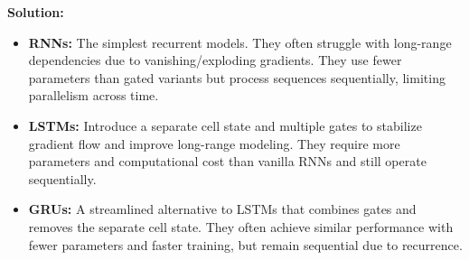 \documentclass{article}
\begin{document}
\begin{enumerate}
   \textbf{Solution:}
    \begin{itemize}
        \item \textbf{RNNs:}
        The simplest recurrent models. They often struggle with long-range dependencies due to vanishing/exploding gradients. They use fewer parameters than gated variants but process sequences sequentially, limiting parallelism across time.
    
        \item \textbf{LSTMs:}
        Introduce a separate cell state and multiple gates to stabilize gradient flow and improve long-range modeling. They require more parameters and computational cost than vanilla RNNs and still operate sequentially.
    
        \item \textbf{GRUs:}
        A streamlined alternative to LSTMs that combines gates and removes the separate cell state. They often achieve similar performance with fewer parameters and faster training, but remain sequential due to recurrence.
    
    \end{itemize}
    
    
        
\end{enumerate}
\end{document}
